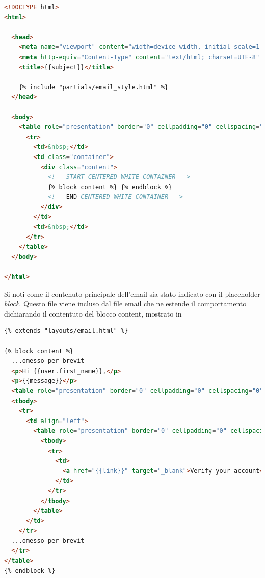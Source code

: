 \documentclass{article}
\begin{document}
\begin{lstlisting}[language=html, style=boxed, label={lst:email-template}, captionpos=b,caption={Layout email utilizzato}]
<!DOCTYPE html>
<html>

  <head>
    <meta name="viewport" content="width=device-width, initial-scale=1.0" />
    <meta http-equiv="Content-Type" content="text/html; charset=UTF-8" />
    <title>{{subject}}</title>

    {% include "partials/email_style.html" %}
  </head>

  <body>
    <table role="presentation" border="0" cellpadding="0" cellspacing="0" class="body">
      <tr>
        <td>&nbsp;</td>
        <td class="container">
          <div class="content">
            <!-- START CENTERED WHITE CONTAINER -->
            {% block content %} {% endblock %}
            <!-- END CENTERED WHITE CONTAINER -->
          </div>
        </td>
        <td>&nbsp;</td>
      </tr>
    </table>
  </body>

</html>

\end{lstlisting}
Si noti come il contenuto principale dell'email sia stato indicato con il placeholder \textit{block}. 
Questo file viene incluso dal file email che ne estende il comportamento dichiarando il contentuto 
del blocco content, mostrato in 

\begin{lstlisting}[language=html, style=boxed, label={lst:content-email-template}, captionpos=b,caption={Corpo dell'email utilizzato}]
{% extends "layouts/email.html" %}

{% block content %}
  ...omesso per brevit
  <p>Hi {{user.first_name}},</p>
  <p>{{message}}</p>
  <table role="presentation" border="0" cellpadding="0" cellspacing="0" ...>
  <tbody>
    <tr>
      <td align="left">
        <table role="presentation" border="0" cellpadding="0" cellspacing="0">
          <tbody>
            <tr>
              <td>
                <a href="{{link}}" target="_blank">Verify your account</a>
              </td>
            </tr>
          </tbody>
        </table>
      </td>
    </tr>
  ...omesso per brevit
  </tr>
</table>
{% endblock %}

\end{lstlisting}
\end{document}
